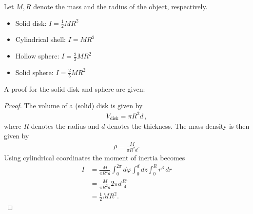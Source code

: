     \begin{example}
        Let $M,R$ denote the mass and the radius of the object, respectively.
        \begin{itemize}
            \item Solid disk: $I = \frac{1}{2}MR^2$
            \item Cylindrical shell: $I = MR^2$
            \item Hollow sphere: $I = \frac{2}{3}MR^2$
            \item Solid sphere: $I = \frac{2}{5}MR^2$
        \end{itemize}
        A proof for the solid disk and sphere are given:
        \begin{mdframed}[roundcorner=10pt, linecolor=blue, linewidth=1pt]
            \begin{proof}[Proof]
                The volume of a (solid) disk is given by
                \begin{gather}
                    V_\text{disk}=\pi R^2d\,,
                \end{gather}
                where $R$ denotes the radius and $d$ denotes the thickness. The mass density is then given by
                \begin{gather}
                    \rho=\frac{M}{\pi R^2d}.
                \end{gather}
                Using cylindrical coordinates the moment of inertia becomes
                \begin{align}
                    I &= \frac{M}{\pi R^2d}\int_0^{2\pi}d\varphi\int_0^ddz\int_0^Rr^3\,dr\nonumber\\
                    &= \frac{M}{\pi R^2d}2\pi d\frac{R^4}{4}\nonumber\\
                    &= \frac{1}{2}MR^2.

\end{align}
\end{proof}
\end{mdframed}
\end{example}
